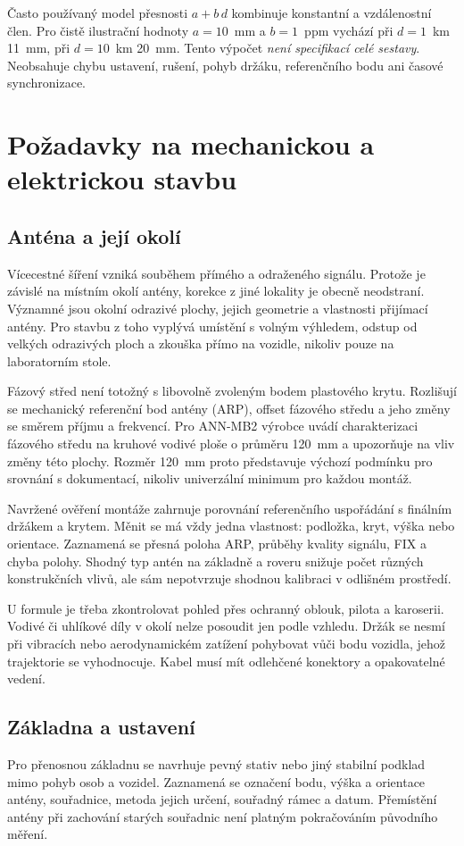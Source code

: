 \documentclass[11pt,a4paper]{article}
\begin{document}
Často používaný model přesnosti $a+b\,d$ kombinuje konstantní a vzdálenostní člen. Pro čistě ilustrační hodnoty $a=10$~mm a $b=1$~ppm vychází při $d=1$~km 11~mm, při $d=10$~km 20~mm. Tento výpočet \emph{není specifikací celé sestavy}. Neobsahuje chybu ustavení, rušení, pohyb držáku, referenčního bodu ani časové synchronizace.

\section{Požadavky na mechanickou a elektrickou stavbu}
\subsection{Anténa a její okolí}
Vícecestné šíření vzniká souběhem přímého a odraženého signálu. Protože je závislé na místním okolí antény, korekce z jiné lokality je obecně neodstraní. Významné jsou okolní odrazivé plochy, jejich geometrie a vlastnosti přijímací antény.\cite{multipath} Pro stavbu z toho vyplývá umístění s volným výhledem, odstup od velkých odrazivých ploch a zkouška přímo na vozidle, nikoliv pouze na laboratorním stole.

Fázový střed není totožný s libovolně zvoleným bodem plastového krytu. Rozlišují se mechanický referenční bod antény (ARP), offset fázového středu a jeho změny se směrem příjmu a frekvencí.\cite{antenna} Pro ANN-MB2 výrobce uvádí charakterizaci fázového středu na kruhové vodivé ploše o průměru 120~mm a upozorňuje na vliv změny této plochy.\cite{ann} Rozměr 120~mm proto představuje výchozí podmínku pro srovnání s dokumentací, nikoliv univerzální minimum pro každou montáž.

Navržené ověření montáže zahrnuje porovnání referenčního uspořádání s finálním držákem a krytem. Měnit se má vždy jedna vlastnost: podložka, kryt, výška nebo orientace. Zaznamená se přesná poloha ARP, průběhy kvality signálu, FIX a chyba polohy. Shodný typ antén na základně a roveru snižuje počet různých konstrukčních vlivů, ale sám nepotvrzuje shodnou kalibraci v odlišném prostředí.

U formule je třeba zkontrolovat pohled přes ochranný oblouk, pilota a karoserii. Vodivé či uhlíkové díly v okolí nelze posoudit jen podle vzhledu. Držák se nesmí při vibracích nebo aerodynamickém zatížení pohybovat vůči bodu vozidla, jehož trajektorie se vyhodnocuje. Kabel musí mít odlehčené konektory a opakovatelné vedení.

\subsection{Základna a ustavení}
Pro přenosnou základnu se navrhuje pevný stativ nebo jiný stabilní podklad mimo pohyb osob a vozidel. Zaznamená se označení bodu, výška a orientace antény, souřadnice, metoda jejich určení, souřadný rámec a datum. Přemístění antény při zachování starých souřadnic není platným pokračováním původního měření.
\end{document}
